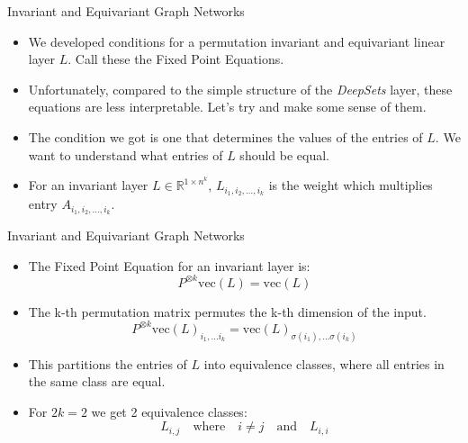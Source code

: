 \documentclass{beamer}
\begin{document}
\begin{frame}{Invariant and Equivariant Graph Networks}
    \begin{itemize}
        \setlength{\itemsep}{\fill}
        \item We developed conditions for a permutation invariant and equivariant linear layer $L$. Call these the Fixed Point Equations.
        \pause
        \item Unfortunately, compared to the simple structure of the \emph{DeepSets} layer, these equations are less interpretable. Let's try and make some sense of them.
        \pause
        \item The condition we got is one that determines the values of the entries of $L$. We want to understand what entries of $L$ should be equal.
        \pause
        \item For an invariant layer $L \in \mathbb{R}^{1 \times n^k}$, $L_{i_1,i_2,\ldots,i_k}$ is the weight which multiplies entry $A_{i_1,i_2,\ldots,i_k}$.
    \end{itemize}
\end{frame}
\begin{frame}{Invariant and Equivariant Graph Networks}
    \begin{itemize}
        \setlength{\itemsep}{\fill}
        \item The Fixed Point Equation for an invariant layer is:
        \[ P^{\otimes k}\text{vec}(L) = \text{vec}(L) \]
        \pause
        \item The k-th permutation matrix permutes the k-th dimension of the input. 
        \[ P^{\otimes k}\text{vec}(L)_{i_1, \ldots i_k} = \text{vec}(L)_{\sigma(i_1), \ldots \sigma(i_k)} \]
        \pause
        \item This partitions the entries of $L$ into equivalence classes, where all entries in the same class are equal.
        \pause
        \item For $2k=2$ we get 2 equivalence classes:
        \[ L_{i,j} \quad \text{where} \quad i \neq j \quad \text{and} \quad L_{i,i} \]
    \end{itemize}
\end{frame}
\end{document}

